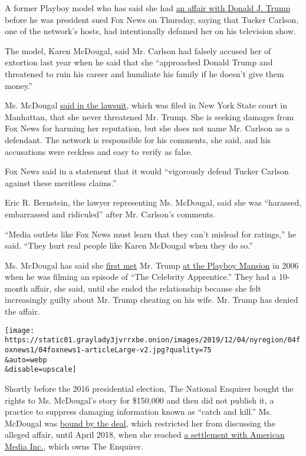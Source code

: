 A former Playboy model who has said she had
\href{https://www.nytimes3xbfgragh.onion/2018/03/22/us/politics/karen-mcdougal-interview.html}{an
affair with Donald J. Trump} before he was president sued Fox News on
Thursday, saying that Tucker Carlson, one of the network's hosts, had
intentionally defamed her on his television show.

The model, Karen McDougal, said Mr. Carlson had falsely accused her of
extortion last year when he said that she ``approached Donald Trump and
threatened to ruin his career and humiliate his family if he doesn't
give them money.''

Ms. McDougal
\href{https://iapps.courts.state.ny.us/fbem/DocumentDisplayServlet?documentId=4ub8tvVfAy/S7qFyyd0pAw==\&system=prod}{said
in the lawsuit}, which was filed in New York State court in Manhattan,
that she never threatened Mr. Trump. She is seeking damages from Fox
News for harming her reputation, but she does not name Mr. Carlson as a
defendant. The network is responsible for his comments, she said, and
his accusations were reckless and easy to verify as false.

Fox News said in a statement that it would ``vigorously defend Tucker
Carlson against these meritless claims.''

Eric R. Bernstein, the lawyer representing Ms. McDougal, said she was
``harassed, embarrassed and ridiculed'' after Mr. Carlson's comments.

``Media outlets like Fox News must learn that they can't mislead for
ratings,'' he said. ``They hurt real people like Karen McDougal when
they do so.''

Ms. McDougal has said she
\href{https://www.nytimes3xbfgragh.onion/2018/03/22/us/politics/karen-mcdougal-interview.html}{first
met} Mr. Trump
\href{https://www.newyorker.com/news/news-desk/donald-trump-a-playboy-model-and-a-system-for-concealing-infidelity-national-enquirer-karen-mcdougal}{at
the Playboy Mansion} in 2006 when he was filming an episode of ``The
Celebrity Apprentice.'' They had a 10-month affair, she said, until she
ended the relationship because she felt increasingly guilty about Mr.
Trump cheating on his wife. Mr. Trump has denied the affair.

\texttt{[image: https://static01.graylady3jvrrxbe.onion/images/2019/12/04/nyregion/04foxnews1/04foxnews1-articleLarge-v2.jpg?quality=75\\\&auto=webp\\\&disable=upscale]}

Shortly before the 2016 presidential election, The National Enquirer
bought the rights to Ms. McDougal's story for \$150,000 and then did not
publish it, a practice to suppress damaging information known as ``catch
and kill.'' Ms. McDougal was
\href{https://www.nytimes3xbfgragh.onion/2018/03/20/us/ex-playboy-model-sues-to-break-silence-on-trump.html}{bound
by the deal}, which restricted her from discussing the alleged affair,
until April 2018, when she reached
\href{https://www.nytimes3xbfgragh.onion/2018/04/18/us/politics/karen-mcdougal-american-media-settlement.html}{a
settlement with American Media Inc.}, which owns The Enquirer.

